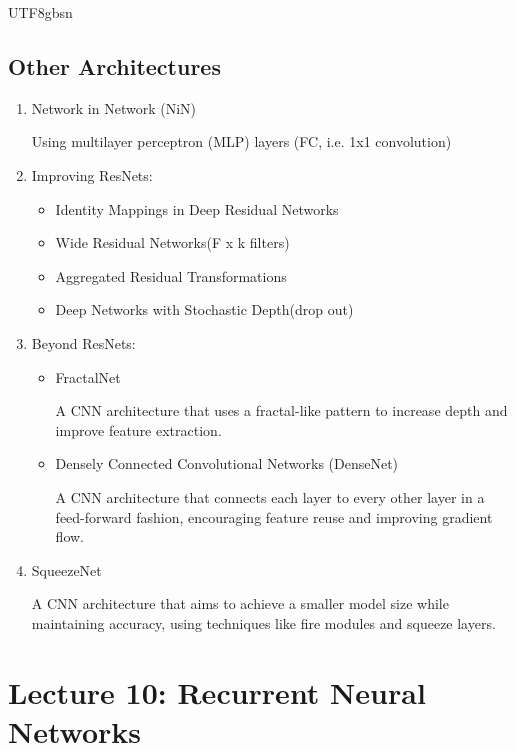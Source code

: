 \documentclass{article}
\numberwithin{equation}{section}
\begin{document}
\begin{CJK}{UTF8}{gbsn}
\begin{enumerate}
\end{enumerate}

\subsection{Other Architectures}
\begin{enumerate}
    \item Network in Network (NiN)\par
    Using multilayer perceptron (MLP) layers (FC, i.e. 1x1 convolution)\par

    \item Improving ResNets:\par
    \begin{itemize}
        \item Identity Mappings in Deep Residual Networks
        \item Wide Residual Networks(F x k filters)
        \item Aggregated Residual Transformations
        \item Deep Networks with Stochastic Depth(drop out)
    \end{itemize}

    \item Beyond ResNets:\par
    \begin{itemize}
        \item FractalNet\par
        A CNN architecture that uses a fractal-like pattern to increase depth and improve feature extraction.\par
        \item Densely Connected Convolutional Networks (DenseNet)\par
        A CNN architecture that connects each layer to every other layer in a feed-forward fashion, encouraging feature reuse and improving gradient flow.\par
    \end{itemize}

    \item SqueezeNet\par
    A CNN architecture that aims to achieve a smaller model size while maintaining accuracy, using techniques like fire modules and squeeze layers.\par
\end{enumerate}
\newpage


\section*{Lecture 10: Recurrent Neural Networks}
\setcounter{section}{10}
\setcounter{subsection}{0}
\setcounter{equation}{0}


\end{CJK}
\end{document}

